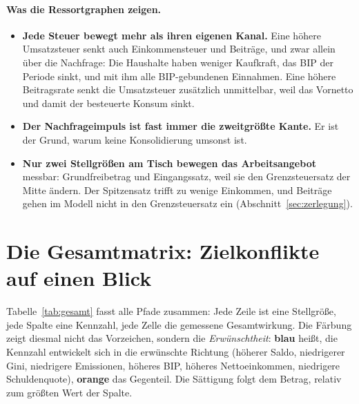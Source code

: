 
\paragraph{Was die Ressortgraphen zeigen.}
\begin{itemize}
\item \textbf{Jede Steuer bewegt mehr als ihren eigenen Kanal.} Eine höhere Umsatzsteuer
  senkt auch Einkommensteuer und Beiträge, und zwar allein über die Nachfrage: Die
  Haushalte haben weniger Kaufkraft, das BIP der Periode sinkt, und mit ihm alle
  BIP-gebundenen Einnahmen. Eine höhere Beitragsrate senkt die Umsatzsteuer zusätzlich
  unmittelbar, weil das Vornetto und damit der besteuerte Konsum sinkt.
\item \textbf{Der Nachfrageimpuls ist fast immer die zweitgrößte Kante.} Er ist der Grund,
  warum keine Konsolidierung umsonst ist.
\item \textbf{Nur zwei Stellgrößen am Tisch bewegen das Arbeitsangebot} messbar:
  Grundfreibetrag und Eingangssatz, weil sie den Grenzsteuersatz der Mitte ändern. Der
  Spitzensatz trifft zu wenige Einkommen, und Beiträge gehen im Modell nicht in den
  Grenzsteuersatz ein (Abschnitt~\ref{sec:zerlegung}).
\end{itemize}

\section{Die Gesamtmatrix: Zielkonflikte auf einen Blick}
\label{sec:matrix}

Tabelle~\ref{tab:gesamt} fasst alle Pfade zusammen: Jede Zeile ist eine Stellgröße, jede
Spalte eine Kennzahl, jede Zelle die gemessene Gesamtwirkung. Die Färbung zeigt diesmal nicht
das Vorzeichen, sondern die \emph{Erwünschtheit}: \textcolor{pos}{\textbf{blau}} heißt, die
Kennzahl entwickelt sich in die erwünschte Richtung (höherer Saldo, niedrigerer Gini,
niedrigere Emissionen, höheres BIP, höheres Nettoeinkommen, niedrigere Schuldenquote),
\textcolor{neg}{\textbf{orange}} das Gegenteil. Die Sättigung folgt dem Betrag, relativ zum
größten Wert der Spalte.

